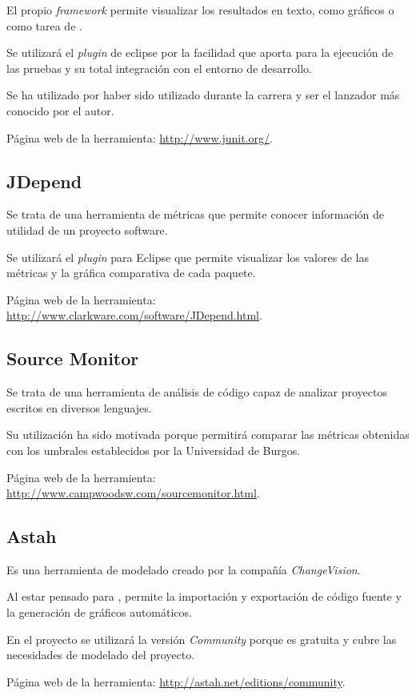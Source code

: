 El propio \textit{framework} permite visualizar los resultados en texto, como gráficos o como tarea de \ant{}.

Se utilizará el \textit{plugin} de eclipse por la facilidad que aporta para la ejecución de las pruebas y su total integración con el entorno de desarrollo.

Se ha utilizado por haber sido utilizado durante la carrera y ser el lanzador más conocido por el autor.

Página web de la herramienta: \url{http://www.junit.org/}.


\subsection{JDepend}
Se trata de una herramienta de métricas que permite conocer información de utilidad de un proyecto software.

Se utilizará el \textit{plugin} para Eclipse que permite visualizar los valores de las métricas y la gráfica comparativa de cada paquete.

Página web de la herramienta: \url{http://www.clarkware.com/software/JDepend.html}.


\subsection{Source Monitor}
Se trata de una herramienta de análisis de código capaz de analizar proyectos escritos en diversos lenguajes.

Su utilización ha sido motivada porque permitirá comparar las métricas obtenidas con los umbrales establecidos por la Universidad de Burgos.

Página web de la herramienta: \url{http://www.campwoodsw.com/sourcemonitor.html}.


\subsection{Astah}
Es una herramienta de modelado \uml{} creado por la compañía \textit{ChangeVision}.

Al estar pensado para \java{}, permite la importación y exportación de código fuente y la generación de gráficos automáticos.

En el proyecto se utilizará la versión \textit{Community} porque es gratuita y cubre las necesidades de modelado del proyecto.

Página web de la herramienta: \url{http://astah.net/editions/community}.


